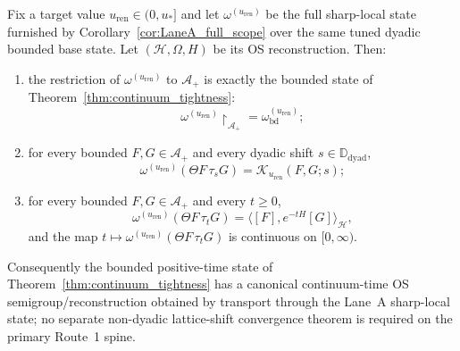 \begin{theorem}\label{thm:continuum_time_OS_upgrade}
Fix a target value $u_{\mathrm{ren}}\in(0,u_\ast]$ and let $\omega^{(u_{\mathrm{ren}})}$ be the full sharp-local state furnished by Corollary~\ref{cor:LaneA_full_scope} over the same tuned dyadic bounded base state.
Let $(\mathcal H,\Omega,H)$ be its OS reconstruction.
Then:
\begin{enumerate}[label=(\roman*),leftmargin=*]
\item the restriction of $\omega^{(u_{\mathrm{ren}})}$ to $\mathcal A_+$ is exactly the bounded state of Theorem~\ref{thm:continuum_tightness}:
\[
\omega^{(u_{\mathrm{ren}})}\!\restriction_{\mathcal A_+}=\omega_{\mathrm{bd}}^{(u_{\mathrm{ren}})};
\]
\item for every bounded $F,G\in\mathcal A_+$ and every dyadic shift $s\in\mathbb D_{\mathrm{dyad}}$,
\[
\omega^{(u_{\mathrm{ren}})}(\Theta F\,\tau_s G)=\mathcal K_{u_{\mathrm{ren}}}(F,G;s);
\]
\item for every bounded $F,G\in\mathcal A_+$ and every $t\ge 0$,
\[
\omega^{(u_{\mathrm{ren}})}(\Theta F\,\tau_t G)=\langle [F],e^{-tH}[G]\rangle_{\mathcal H},
\]
and the map $t\mapsto \omega^{(u_{\mathrm{ren}})}(\Theta F\,\tau_t G)$ is continuous on $[0,\infty)$.
\end{enumerate}
Consequently the bounded positive-time state of Theorem~\ref{thm:continuum_tightness} has a canonical continuum-time OS semigroup/reconstruction obtained by transport through the Lane~A sharp-local state; no separate non-dyadic lattice-shift convergence theorem is required on the primary Route~1 spine.
\end{theorem}

